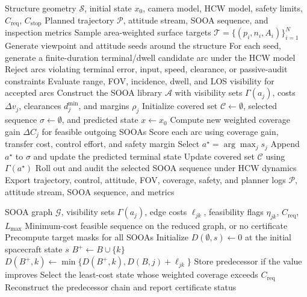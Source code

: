 \begin{algorithm}[t]
\caption{SOOA-based orbital coverage planner}
\label{alg:offline-planner}
\begin{algorithmic}[1]
\Require Structure geometry $\mathcal{S}$, initial state $x_0$, camera model,
HCW model, safety limits, $C_{\mathrm{req}}$, $C_{\mathrm{stop}}$
\Ensure Planned trajectory $\mathcal{P}$, attitude stream, SOOA sequence, and
inspection metrics
\State Sample area-weighted surface targets
$\mathcal{T}=\{(p_i,n_i,A_i)\}_{i=1}^N$
\State Generate viewpoint and attitude seeds around the structure
\State For each seed, generate a finite-duration terminal/dwell candidate arc
under the HCW model
\State Reject arcs violating terminal error, input, speed, clearance, or
passive-audit constraints
\State Evaluate range, FOV, incidence, dwell, and LOS visibility for accepted
arcs
\State Construct the SOOA library $\mathcal{A}$ with visibility sets
$\Gamma(a_j)$, costs $\Delta v_j$, clearances $d^{\min}_j$, and margins
$\rho_j$
\State Initialize covered set $\mathcal{C}\gets\emptyset$, selected sequence
$\sigma\gets\emptyset$, and predicted state $x\gets x_0$
  \State Compute new weighted coverage gain $\Delta C_j$ for feasible outgoing
  SOOAs
  \State Score each arc using coverage gain, transfer cost, control effort, and
  safety margin
  \State Select $a^\star=\arg\max_j s_j$
  \State Append $a^\star$ to $\sigma$ and update the predicted terminal state
  \State Update covered set $\mathcal{C}$ using $\Gamma(a^\star)$
\EndWhile
\State Roll out and audit the selected SOOA sequence under HCW dynamics
\State Export trajectory, control, attitude, FOV, coverage, safety, and planner
logs
\State \Return $\mathcal{P}$, attitude stream, SOOA sequence, and metrics
\end{algorithmic}
\end{algorithm}

\begin{algorithm}[t]
\caption{Certified reduced-SOOA-graph dynamic program}
\label{alg:certified-dp}
\begin{algorithmic}[1]
\Require SOOA graph $\mathcal G$, visibility sets $\Gamma(a_j)$, edge costs
$\ell_{jk}$, feasibility flags $\eta_{jk}$, $C_{\mathrm{req}}$, $L_{\max}$
\Ensure Minimum-cost feasible sequence on the reduced graph, or no certificate
\State Precompute target masks for all SOOAs
\State Initialize $D(\emptyset,s)\gets0$ at the initial spacecraft state $s$
      \State $B^+\gets B\cup\{k\}$
      \State $D(B^+,k)\gets\min\{D(B^+,k),D(B,j)+\ell_{jk}\}$
      \State Store predecessor if the value improves
    \EndFor
  \EndFor
\EndFor
\State Select the least-cost state whose weighted coverage exceeds
$C_{\mathrm{req}}$
\State Reconstruct the predecessor chain and report certificate status
\end{algorithmic}
\end{algorithm}
